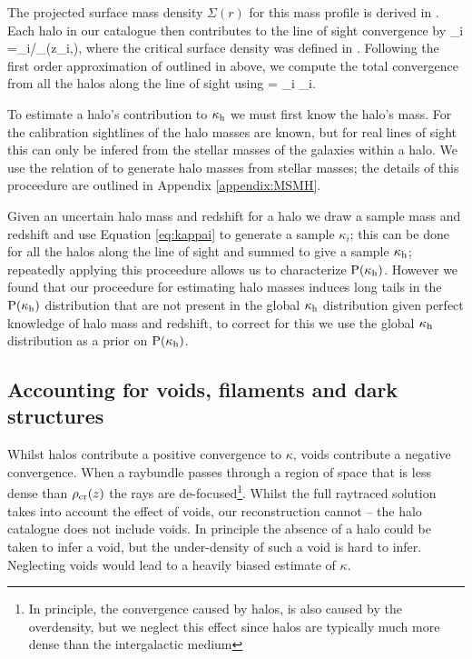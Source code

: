 \documentclass[useAMS,usenatbib]{mn2e}
\begin{document}
The projected surface mass density $\Sigma(r)$ for this mass profile is derived in \citet{BMO}. Each halo in our catalogue then contributes to the line of sight convergence by
\be
\label{eq:kappai}
\kappa_i =\Sigma_{i}/\Sigma_{}(z_i,\zs),
\ee
where the critical surface density was defined in .
Following the first order approximation of \citet{HilbertEtal2009}
outlined in  above, we compute 
the total convergence from all the halos along the line
of sight using
\be 
\label{eq:kappasummu}
\kappah = \sum_{i} \kappa_i.
\ee

To estimate a halo's contribution to $\kappa_{\rm h}$ we must first know the halo's mass.
For the calibration sightlines of the \MS halo masses are known, but for 
real lines of sight this can only be infered from the stellar masses of the
galaxies within a halo. We use the relation of \citet{BehrooziEtal2010} to generate 
halo masses from stellar masses; the details of this proceedure are outlined in
Appendix \ref{appendix:MSMH}.

Given an uncertain halo mass and redshift for a halo we draw a sample mass and redshift and use Equation \ref{eq:kappai} to generate a sample $\kappa_i$; this can be done for all the halos along the line of sight and summed to give a sample $\kappa_{\rm h}$; repeatedly applying this proceedure allows us to characterize ${\rm P}(\kappa_{\rm h})$. However we found that our proceedure for estimating halo masses induces long tails in the ${\rm P}(\kappa_{\rm h})$ distribution that are not present in the global $\kappa_{\rm h}$ distribution given perfect knowledge of halo mass and redshift, to correct for this we use the global $\kappa_{\rm h}$ distribution as a prior on ${\rm P}(\kappa_{\rm h})$.


\subsection{Accounting for voids, filaments and dark structures}
\label{subsec:voids}

Whilst halos contribute a positive convergence to $\kappa$, voids contribute
a negative convergence. When a raybundle passes through a  region of space
that is less dense than $\rho_{\rm cr}(z)$ the rays are de-focused\footnote{In
principle, the convergence caused by halos, is also caused by the overdensity,
but we neglect this effect since halos are typically much more dense than the
intergalactic medium}. Whilst the  full raytraced solution takes into account
the effect of voids, our reconstruction cannot -- the halo catalogue does not
include voids. In principle the absence of a halo could be taken to infer a
void, but the under-density of such a void is hard to infer. Neglecting voids
would lead to a heavily biased estimate of $\kappa$. 
\end{document}
